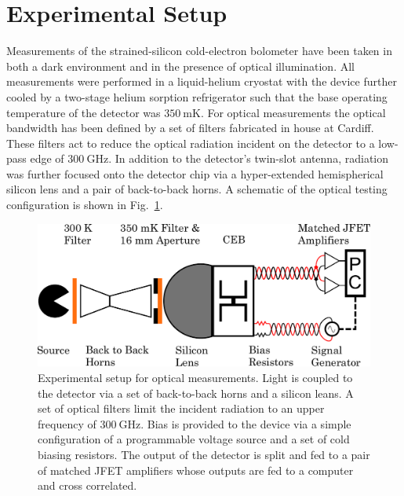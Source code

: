 \documentclass[journal, a4paper]{IEEEtran}
\begin{document}
\section{Experimental Setup}
Measurements of the strained-silicon cold-electron bolometer have been taken in both a dark environment and in the presence of optical illumination. All measurements were performed in a liquid-helium cryostat with the device further cooled by a two-stage helium sorption refrigerator such that the base operating temperature of the detector was $350~\mathrm{mK}$. For optical measurements the optical bandwidth has been defined by a set of filters fabricated in house at Cardiff. These filters act to reduce the optical radiation incident on the detector to a low-pass edge of $300~\mathrm{GHz}$. In addition to the detector's twin-slot antenna, radiation was further focused onto the detector chip via a hyper-extended hemispherical silicon lens and a pair of back-to-back horns. A schematic of the optical testing configuration is shown in Fig.~\ref{fig:setup}.
\begin{figure}[htb]
\begin{center}
\includegraphics[width=0.8\columnwidth]{experimental_setup}
\caption{Experimental setup for optical measurements. Light is coupled to the detector via a set of back-to-back horns and a silicon leans. A set of optical filters limit the incident radiation to an upper frequency of $300~\mathrm{GHz}$. Bias is provided to the device via a simple configuration of a programmable voltage source and a set of cold biasing resistors. The output of the detector is split and fed to a pair of matched JFET amplifiers whose outputs are fed to a computer and cross correlated.}
\label{fig:setup}
\end{center}
\end{figure}
\par 
\end{document}

